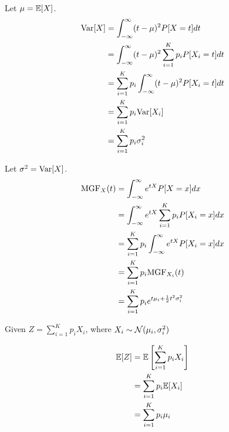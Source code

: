 \begin{solution}
	Let $\mu = \mathbb{E}[X]$.
	\begin{align}
		\text{Var}[X] & = \int_{-\infty}^{\infty} (t-\mu)^2 P[X=t] dt                    \\
		        & = \int_{-\infty}^{\infty} (t-\mu)^2 \sum_{i=1}^K p_iP[X_i=t] dt  \\
		        & = \sum_{i=1}^K p_i \int_{-\infty}^{\infty} (t-\mu)^2 P[X_i=t] dt \\
		        & = \sum_{i=1}^K p_i \text{Var}[X_i]                                     \\
		        & = \sum_{i=1}^K p_i\sigma_i^2
	\end{align}

	Let $\sigma^2 = \text{Var}[X]$.
	\begin{align}
		\text{MGF}_X(t) & = \int_{-\infty}^{\infty} e^{tX}P[X=x]dx                     \\
		          & = \int_{-\infty}^{\infty} e^{tX} \sum_{i=1}^K p_iP[X_i=x] dx \\
		          & = \sum_{i=1}^K p_i \int_{-\infty}^{\infty} e^{tX}P[X_i=x] dx \\
		          & = \sum_{i=1}^K p_i\text{MGF}_{X_i}(t)                              \\
		          & = \sum_{i=1}^K p_i e^{t\mu_i + \frac{1}{2}t^2\sigma_i^2}
	\end{align}

	Given $Z=\sum_{i=1}^Kp_iX_i$, where $X_i\sim\mathcal{N}(\mu_i,\sigma_i^2)$

	\begin{align}
		\mathbb{E}[Z] & = \mathbb{E}\left[\sum_{i=1}^Kp_iX_i\right] \\
		      & = \sum_{i=1}^Kp_i\mathbb{E}[X_i]            \\
		      & = \sum_{i=1}^Kp_i\mu_i
	\end{align}

\end{solution}
